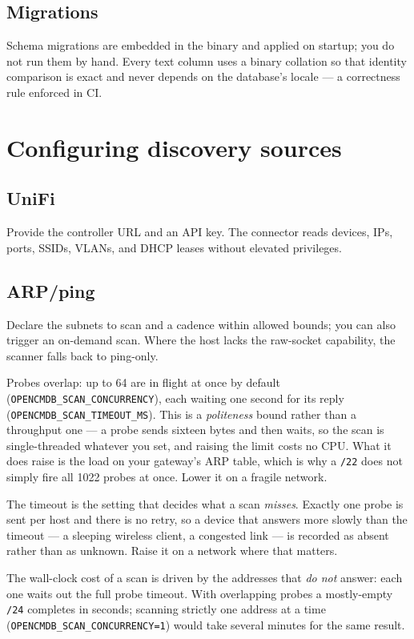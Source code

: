 \documentclass[11pt,oneside,listof=totoc,bibliography=totoc]{scrreprt}
\begin{document}
\section{Migrations}
Schema migrations are embedded in the binary and applied on startup; you do not run them by
hand. Every text column uses a binary collation so that identity comparison is exact and
never depends on the database's locale — a correctness rule enforced in CI.

\chapter{Configuring discovery sources}
\section{UniFi}
Provide the controller URL and an API key. The connector reads devices, IPs, ports, SSIDs,
VLANs, and DHCP leases without elevated privileges.

\section{ARP/ping}
Declare the subnets to scan and a cadence within allowed bounds; you can also trigger an
on-demand scan. Where the host lacks the raw-socket capability, the scanner falls back to
ping-only.

Probes overlap: up to 64 are in flight at once by default
(\texttt{OPENCMDB\_SCAN\_CONCURRENCY}), each waiting one second for its reply
(\texttt{OPENCMDB\_SCAN\_TIMEOUT\_MS}). This is a \emph{politeness} bound rather than a
throughput one --- a probe sends sixteen bytes and then waits, so the scan is single-threaded
whatever you set, and raising the limit costs no CPU. What it does raise is the load on your
gateway's ARP table, which is why a \texttt{/22} does not simply fire all 1022 probes at once.
Lower it on a fragile network.

\begin{warning}
The timeout is the setting that decides what a scan \emph{misses}. Exactly one probe is sent per
host and there is no retry, so a device that answers more slowly than the timeout --- a sleeping
wireless client, a congested link --- is recorded as absent rather than as unknown. Raise it on a
network where that matters.
\end{warning}

\begin{note}
The wall-clock cost of a scan is driven by the addresses that \emph{do not} answer: each one
waits out the full probe timeout. With overlapping probes a mostly-empty \texttt{/24} completes
in seconds; scanning strictly one address at a time
(\texttt{OPENCMDB\_SCAN\_CONCURRENCY=1}) would take several minutes for the same result.
\end{note}
\end{document}
